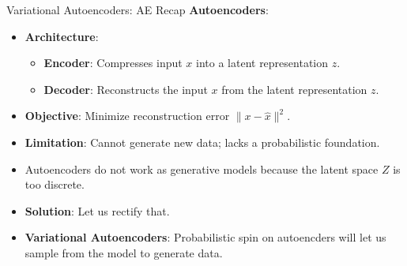 \begin{frame}[allowframebreaks]{Variational Autoencoders: AE Recap}
\textbf{Autoencoders}:
\begin{itemize}
    \item \textbf{Architecture}:
        \begin{itemize}
            \item \textbf{Encoder}: Compresses input \( x \) into a latent representation \( z \).
            \item \textbf{Decoder}: Reconstructs the input \( x \) from the latent representation \( z \).
        \end{itemize}
    \item \textbf{Objective}: Minimize reconstruction error \( \lVert x - \hat{x} \rVert^2 \).
    \
    \item \textbf{Limitation}: Cannot generate new data; lacks a probabilistic foundation.
\end{itemize}

\framebreak

\begin{itemize}
    \item Autoencoders do not work as generative models because the latent space $Z$ is too discrete.
    \item \textbf{Solution}: Let us rectify that.
    \item \textbf{Variational Autoencoders}: Probabilistic spin on autoencders will let us sample from the model to generate data.
\end{itemize}

\end{frame}